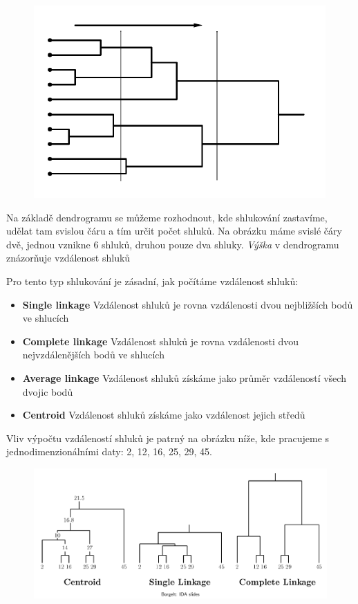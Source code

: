 \begin{figure}[ht!]
\centering
\includegraphics{SAN/img/dendrogram.png}
\end{figure}

Na základě dendrogramu se můžeme rozhodnout, kde shlukování zastavíme, udělat tam svislou čáru a tím určit počet shluků. Na obrázku máme svislé čáry dvě, jednou vznikne 6 shluků, druhou pouze dva shluky. \textit{Výška} v dendrogramu znázorňuje vzdálenost shluků

Pro tento typ shlukování je zásadní, jak počítáme vzdálenost shluků:
\begin{itemize}
\item \textbf{Single linkage} Vzdálenost shluků je rovna vzdálenosti dvou nejbližších bodů ve shlucích
\item \textbf{Complete linkage} Vzdálenost shluků je rovna vzdálenosti dvou nejvzdálenějších bodů ve shlucích
\item \textbf{Average linkage} Vzdálenost shluků získáme jako průměr vzdáleností všech dvojic bodů
\item \textbf{Centroid} Vzdálenost shluků získáme jako vzdálenost jejich středů
\end{itemize}

Vliv výpočtu vzdáleností shluků je patrný na obrázku níže, kde pracujeme s jednodimenzionálními daty: 2, 12, 16, 25, 29, 45.

\begin{figure}[ht!]
\centering
\includegraphics[width=\textwidth]{SAN/img/dendrogram-example.png}
\end{figure}

